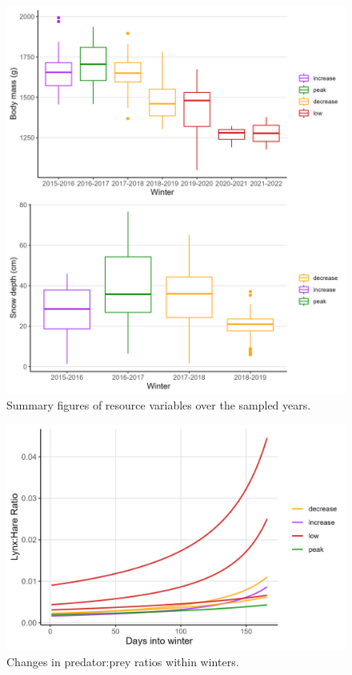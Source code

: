 \documentclass[
]{article}
\begin{document}
\begin{figure}
\centering
\includegraphics{output/figures/resource.jpeg}
\caption{Summary figures of resource variables over the sampled years.}
\end{figure}

\begin{figure}
\centering
\includegraphics{output/figures/ppratios.jpeg}
\caption{Changes in predator:prey ratios within winters.}
\end{figure}
\end{document}
